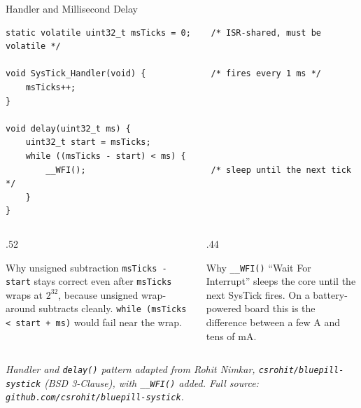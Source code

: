 \documentclass[9pt,aspectratio=169,xcolor=table]{beamer}
\begin{document}
\begin{frame}[fragile]{Handler and Millisecond Delay}
\begin{lstlisting}[style=myc, basicstyle=\ttfamily\footnotesize]
static volatile uint32_t msTicks = 0;    /* ISR-shared, must be volatile */

void SysTick_Handler(void) {             /* fires every 1 ms */
    msTicks++;
}

void delay(uint32_t ms) {
    uint32_t start = msTicks;
    while ((msTicks - start) < ms) {
        __WFI();                         /* sleep until the next tick */
    }
}
\end{lstlisting}

    \vspace{2mm}
    \begin{columns}[T]
    \begin{column}{.52\textwidth}
        \begin{block}{Why unsigned subtraction}
            {\footnotesize \texttt{msTicks - start} stays correct even
            after \texttt{msTicks} wraps at $2^{32}$, because unsigned
            wrap-around subtracts cleanly. \texttt{while (msTicks < start
            + ms)} would \alert{fail} near the wrap.}
        \end{block}
    \end{column}
    \begin{column}{.44\textwidth}
        \begin{block}{Why \texttt{\_\_WFI()}}
            {\footnotesize ``Wait For Interrupt'' sleeps the core until the
            next SysTick fires. On a battery-powered board this is the
            difference between a few \textmu A and tens of mA.}
        \end{block}
    \end{column}
    \end{columns}

    \vspace{2mm}
    {\scriptsize\centering\emph{Handler and \texttt{delay()} pattern adapted
    from Rohit Nimkar, \texttt{csrohit/bluepill-systick} (BSD 3-Clause),
    with \texttt{\_\_WFI()} added. Full source:
    \texttt{github.com/csrohit/bluepill-systick}.}\par}
\end{frame}
\end{document}
